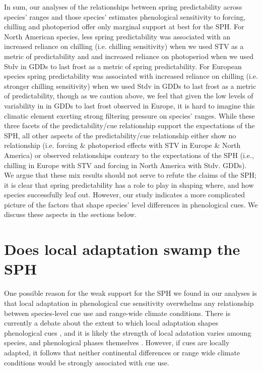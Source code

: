 \documentclass[12pt]{article}
\begin{document}
In sum, our analyses of the relationships between spring predictability across species' ranges and those species' estimates phenological sensitivity to forcing, chilling and photoperiod offer only marginal support at best for the SPH. For North American species, less spring predictability was associated with an increased reliance on chilling (i.e. chilling sensitivity) when we used STV as a metric of predictability and and increased reliance on photoperiod when we used Stdv in GDDs to last frost as a metric of spring predictability. For European species spring predictability was associated with increased reliance on chilling (i.e. stronger chilling sensitivity) when we used  Stdv in GDDs to last frost as a metric of predictability, though as we caution above, we feel that given the low levels of variability in in GDDs to last frost observed in Europe, it is hard to imagine this climatic element exerting strong filtering pressure on species' ranges. While these three facets of the predictability/cue relationship support the expectations of the SPH, all other aspects of the predictability/cue relationship either show no relationship (i.e. forcing \& photoperiod effects with STV in Europe \& North America) or observed relationships contrary to the expectations of the SPH (i.e., chilling in Europe with STV and forcing in North America with Stdv. GDDs). We argue that these mix results should not serve to refute the claims of the SPH; it is clear that spring predictability has a role to play in shaping where, and how species successfully leaf out. However, our study indicates a more complicated picture of the factors that shape species' level differences in phenological cues. We discuss these aspects in the sections below.


\section*{Does local adaptation swamp the SPH}
One possible reason for the weak support for the SPH we found in our analyses is that local adaptation in phenological cue sensitivity overwhelms any relationship between species-level cue use and range-wide climate conditions. There is currently a debate about the extent to which local adaptation shapes phenological cues \citep{}, and it is likely the strength of local adatation varies amoung species, and phenological phases themselves \citep{}. However, if cues are locally adapted, it follows that neither continental differences or range wide climate conditions would be strongly associated with cue use. 
\end{document}
